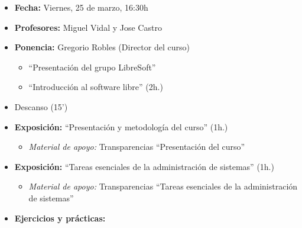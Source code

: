 \begin{itemize}
  \item \textbf{Fecha:} Viernes, 25 de marzo, 16:30h
  \item \textbf{Profesores:} Miguel Vidal y Jose Castro
  \item \textbf{Ponencia:} Gregorio Robles (Director del curso)
    \begin{itemize}
      \item ``Presentación del grupo LibreSoft''
      \item ``Introducción al software libre'' (2h.)   
    \end{itemize}
  \item Descanso (15')
  \item \textbf{Exposición:} ``Presentación y metodología del curso'' (1h.)
    \begin{itemize}
      \item \textit{Material de apoyo:} Transparencias ``Presentación del curso'' 
    \end{itemize}
  \item \textbf{Exposición:} ``Tareas esenciales de la administración de sistemas'' (1h.)
    \begin{itemize}
      \item \textit{Material de apoyo:} Transparencias ``Tareas esenciales de la administración de sistemas''
    \end{itemize}
  \item \textbf{Ejercicios y prácticas:}
\end{itemize}


